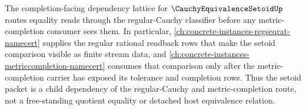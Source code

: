 The completion-facing dependency lattice for $\CauchyEquivalenceSetoidUp$ routes equality reads through the regular-Cauchy classifier before any metric-completion consumer sees them. In particular, \autoref{ch:concrete-instances-regseqrat-namecert} supplies the regular rational readback rows that make the setoid comparison visible as finite stream data, and \autoref{ch:concrete-instances-metriccompletion-namecert} consumes that comparison only after the metric-completion carrier has exposed its tolerance and completion rows. Thus the setoid packet is a child dependency of the regular-Cauchy and metric-completion route, not a free-standing quotient equality or detached host equivalence relation.
